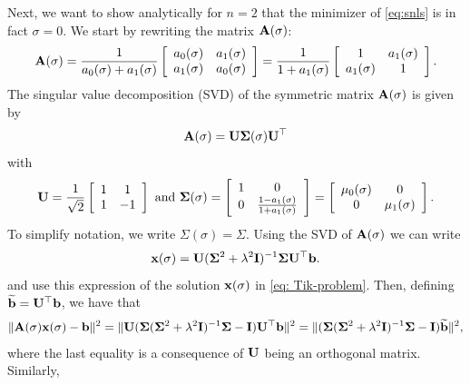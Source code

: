 \documentclass[onefignum,onetabnum]{siamart171218}
\newcommand{\bA}{{\bf A}}
\newcommand{\bI}{{\bf I}}
\newcommand{\bU}{{\bf U}}
\newcommand{\bb}{{\bf b}}
\newcommand{\bx}{{\bf x}}
\newcommand{\bSigma}{{\bf \Sigma}}
\begin{document}
Next, we want to show analytically for $n=2$ that the minimizer of \eqref{eq:snls} is in fact $\sigma=0$. 
We start by rewriting the matrix $\bA(\sigma)$:
\begin{equation*}\bA(\sigma) = \frac{1}{a_0(\sigma)+a_1(\sigma)}\left[ \begin{array}{cc} a_0(\sigma) & a_1(\sigma) \\ a_1(\sigma) & a_0(\sigma)\end{array}\right] =  \frac{1}{1+a_1(\sigma)}\left[ \begin{array}{cc} 1 & a_1(\sigma) \\ a_1(\sigma) & 1\end{array}\right]. \end{equation*} The singular value decomposition (SVD) of the symmetric matrix $\bA(\sigma)$ is given by 
\[\bA(\sigma) = \bU \bSigma (\sigma) \bU^\top\] 
with 
\begin{equation*}\bU = \frac{1}{\sqrt{2}}\left[\begin{array}{cc} 1 & 1 \\ 1 & -1\end{array} \right] \mbox{ and } \bSigma (\sigma) = \left[\begin{array}{cc} 1 & 0 \\ 0 & \frac{1-a_1(\sigma)}{1+a_1(\sigma)}\end{array} \right] = \left[\begin{array}{cc} \mu_0(\sigma) & 0 \\ 0 & \mu_1(\sigma)\end{array} \right].\end{equation*}
To simplify notation, we write $\Sigma(\sigma)=\Sigma$.
Using the SVD of $\bA(\sigma)$ we can %
write
\begin{equation*}\bx(\sigma) = \bU (\bSigma^2 + \lambda^2 \bI)^{-1} \bSigma \bU^{\top} \bb.\end{equation*}
and %
use this expression of the solution $\bx(\sigma)$ in \eqref{eq: Tik-problem}. Then, defining $\widetilde{\bb} = \bU^\top \bb$, we have that
\begin{align*}
\| \bA(\sigma) \bx(\sigma) - \bb\|^2 = 
\| \bU (\bSigma (\bSigma^2 + \lambda^2 \bI)^{-1} \bSigma  - \bI) \bU^{\top} \bb\|^2= \| (\bSigma (\bSigma^2 + \lambda^2 \bI)^{-1} \bSigma  - \bI) \widetilde{\bb}\|^2, 
\end{align*}
where the last equality is a consequence of $\bU$ being an orthogonal matrix. Similarly,
\end{document}
